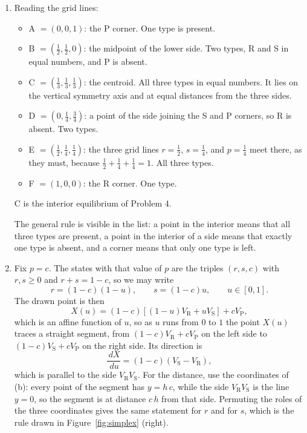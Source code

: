 \documentclass[a4paper,12pt]{article}
\newcommand{\dd}{\,d}
\begin{document}
\begin{enumerate}[label=(\alph*)]
\item Reading the grid lines:
\begin{itemize}
\item A $=\left( 0,0,1 \right)$: the P corner. One type is present.
\item B $=\left( \frac12,\frac12,0 \right)$: the midpoint of the lower side. Two types, R and S in equal numbers, and P is absent.
\item C $=\left( \frac13,\frac13,\frac13 \right)$: the centroid. All three types in equal numbers. It lies on the vertical symmetry axis and at equal distances from the three sides.
\item D $=\left( 0,\frac14,\frac34 \right)$: a point of the side joining the S and P corners, so R is absent. Two types.
\item E $=\left( \frac12,\frac14,\frac14 \right)$: the three grid lines $r=\frac12$, $s=\frac14$, and $p=\frac14$ meet there, as they must, because $\frac12+\frac14+\frac14=1$. All three types.
\item F $=\left( 1,0,0 \right)$: the R corner. One type.
\end{itemize}
C is the interior equilibrium of Problem 4.

The general rule is visible in the list: a point in the interior means that all three types are present, a point in the interior of a side means that exactly one type is absent, and a corner means that only one type is left.

\item Fix $p=c$. The states with that value of $p$ are the triples $\left( r,s,c \right)$ with $r,s\geq 0$ and $r+s=1-c$, so we may write
\[ r = \left( 1-c \right)\left( 1-u \right), \qquad s = \left( 1-c \right)u, \qquad u \in \left[ 0,1 \right] . \]
The drawn point is then
\[ X(u) = \left( 1-c \right)\left[ \left( 1-u \right)V_{\text{R}} + u V_{\text{S}} \right] + c V_{\text{P}} , \]
which is an affine function of $u$, so as $u$ runs from $0$ to $1$ the point $X(u)$ traces a straight segment, from $\left( 1-c \right)V_{\text{R}}+cV_{\text{P}}$ on the left side to $\left( 1-c \right)V_{\text{S}}+cV_{\text{P}}$ on the right side. Its direction is
\[ \frac{\dd X}{\dd u} = \left( 1-c \right)\left( V_{\text{S}}-V_{\text{R}} \right) , \]
which is parallel to the side $V_{\text{R}}V_{\text{S}}$. For the distance, use the coordinates of (b): every point of the segment has $y = h\,c$, while the side $V_{\text{R}}V_{\text{S}}$ is the line $y=0$, so the segment is at distance $c\,h$ from that side. Permuting the roles of the three coordinates gives the same statement for $r$ and for $s$, which is the rule drawn in Figure~\ref{fig:simplex} (right).


\end{enumerate}
\end{document}
